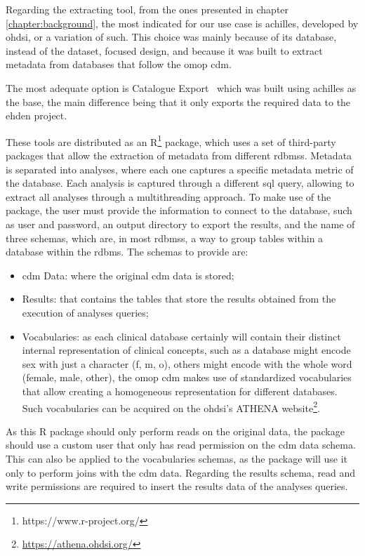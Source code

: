 Regarding the extracting tool, from the ones presented in chapter \ref{chapter:background}, the most indicated for our use case is \gls{achilles}, developed by \gls{ohdsi}, or a variation of such.
This choice was mainly because of its database, instead of the dataset, focused design, and because it was built to extract metadata from databases that follow the \gls{omop} \gls{cdm}.

The most adequate option is Catalogue Export~\cite{peters-tool} which was built using \gls{achilles} as the base, the main difference being that it only exports the required data to the \gls{ehden} project.

These tools are distributed as an R\footnote{https://www.r-project.org/} package, which uses a set of third-party packages that allow the extraction of metadata from different \gls{rdbms}s.
Metadata is separated into analyses, where each one captures a specific metadata metric of the database.
Each analysis is captured through a different \gls{sql} query, allowing to extract all analyses through a multithreading approach.
To make use of the package, the user must provide the information to connect to the database, such as user and password, an output directory to export the results, and the name of three schemas, which are, in most \gls{rdbms}s, a way to group tables within a database within the \gls{rdbms}.
The schemas to provide are:

\begin{itemize}
    \item \gls{cdm} Data: where the original \gls{cdm} data is stored;
    \item Results: that contains the tables that store the results obtained from the execution of analyses queries;
    \item Vocabularies: as each clinical database certainly will contain their distinct internal representation of clinical concepts, such as a database might encode sex with just a character (f, m, o), others might encode with the whole word (female, male, other), the \gls{omop} \gls{cdm} makes use of standardized vocabularies that allow creating a homogeneous representation for different databases.
        Such vocabularies can be acquired on the \gls{ohdsi}'s ATHENA website\footnote{\url{https://athena.ohdsi.org/}}.
\end{itemize}

As this R package should only perform reads on the original data, the package should use a custom user that only has read permission on the \gls{cdm} data schema.
This can also be applied to the vocabularies schemas, as the package will use it only to perform joins with the \gls{cdm} data.
Regarding the results schema, read and write permissions are required to insert the results data of the analyses queries.


